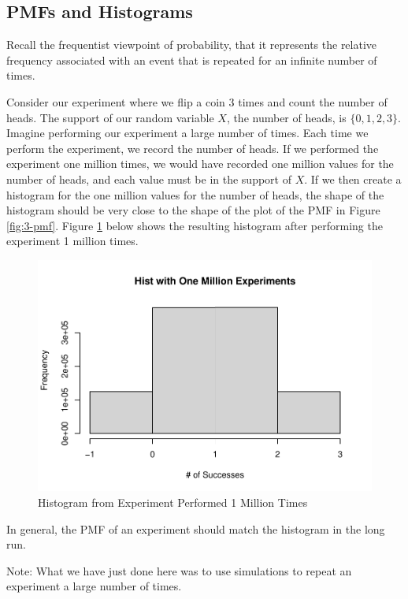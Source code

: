 \documentclass[
]{book}
\begin{document}
\subsection{PMFs and Histograms}\label{pmfhist}

Recall the frequentist viewpoint of probability, that it represents the relative frequency associated with an event that is repeated for an infinite number of times.

Consider our experiment where we flip a coin 3 times and count the number of heads. The support of our random variable \(X\), the number of heads, is \(\{0,1,2,3 \}\). Imagine performing our experiment a large number of times. Each time we perform the experiment, we record the number of heads. If we performed the experiment one million times, we would have recorded one million values for the number of heads, and each value must be in the support of \(X\). If we then create a histogram for the one million values for the number of heads, the shape of the histogram should be very close to the shape of the plot of the PMF in Figure \ref{fig:3-pmf}. Figure \ref{fig:3-sim} below shows the resulting histogram after performing the experiment 1 million times.

\begin{figure}
\centering
\includegraphics{bookdown-demo_files/figure-latex/3-sim-1.pdf}
\caption{\label{fig:3-sim}Histogram from Experiment Performed 1 Million Times}
\end{figure}

In general, the PMF of an experiment should match the histogram in the long run.

Note: What we have just done here was to use simulations to repeat an experiment a large number of times.
\end{document}
